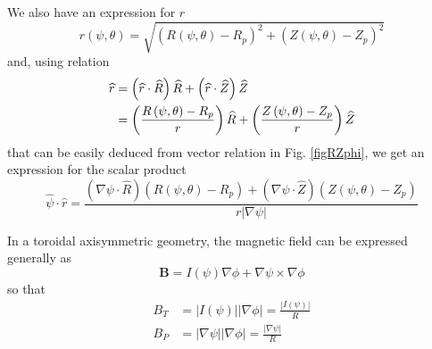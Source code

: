  

We also have an expression for $r$ 
\begin{equation}
r\left( \psi ,\theta \right) =\sqrt{\left( R\left( \psi ,\theta \right)
-R_{p}\right) ^{2}+\left( Z\left( \psi ,\theta \right) -Z_{p}\right) ^{2}}
\label{r}
\end{equation}
and, using relation 
\begin{align}
\widehat{r}& =\left( \widehat{r}\cdot \widehat{R}\right) \widehat{R}+\left( 
\widehat{r}\cdot \widehat{Z}\right) \widehat{Z}  \notag \\
& =\left( \frac{R\left( \psi ,\theta \right) -R_{p}}{r}\right) \widehat{R}%
+\left( \frac{Z\left( \psi ,\theta \right) -Z_{p}}{r}\right) \widehat{Z}
\end{align}
that can be easily deduced from vector relation in Fig. \ref{figRZphi}, we
get an expression for the scalar product 
\begin{equation}
\widehat{\psi }\cdot \widehat{r}=\frac{\left( \nabla \psi \cdot \widehat{R}%
\right) \left( R\left( \psi ,\theta \right) -R_{p}\right) +\left( \nabla
\psi \cdot \widehat{Z}\right) \left( Z\left( \psi ,\theta \right)
-Z_{p}\right) }{r\left| \nabla \psi \right| }  \label{psidotr}
\end{equation}

In a toroidal axisymmetric geometry, the magnetic field can be expressed
generally as 
\begin{equation}
\mathbf{B}=I\left( \psi \right) \nabla \phi +\nabla \psi \times \nabla \phi
\label{B}
\end{equation}
 so that 
\begin{align}
B_{T}& =\left| I\left( \psi \right) \right| \left| \nabla \phi \right| =%
\frac{\left| I\left( \psi \right) \right| }{R}  \label{Bt1} \\
B_{P}& =\left| \nabla \psi \right| \left| \nabla \phi \right| =\frac{\left|
\nabla \psi \right| }{R}  \label{Bp1}
\end{align}

